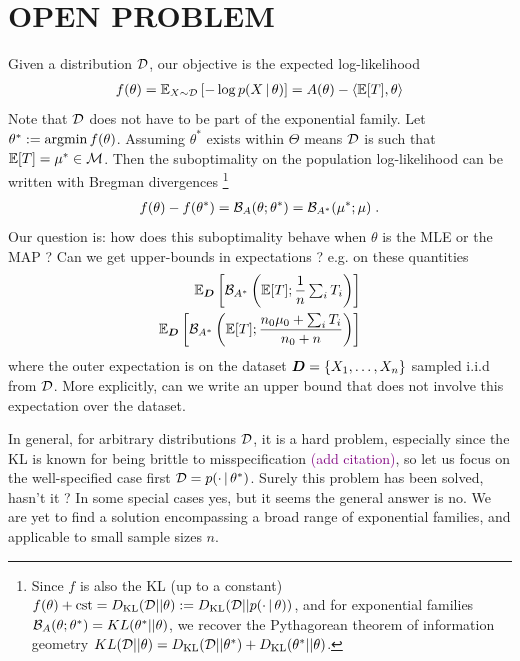 \documentclass[twoside]{article}
\let\oldsection\section
\renewcommand{\section}[1]{\oldsection{\texorpdfstring{\uppercase{#1}}{#1}}}
\newcommand{\tocite}{\textcolor{purple}{(add citation)}}
\newcommand*{\expect}[2][]{\ensuremath{\mathbb{E}_{#1} \left[ #2 \right] }} %
\newcommand{\cond}{\,\vert\,}
\newcommand{\logpart}{A}
\newcommand{\bregman}{\cB_\logpart}
\newcommand{\bregmanconj}{\cB_{\logpart^*}}
\newcommand{\nat}{\theta}
\newcommand{\m}{\mu}
\newcommand{\meanp}{\m}
\begin{document}
\section{Open Problem}
Given a distribution ${\mathcal D}$, our objective is the expected log-likelihood 
\begin{align}
	f(\nat) = \expect[X \sim \cD]{-\log p(X \cond \nat)} 
	 = \logpart(\nat) - \langle \E[T] , \nat \rangle
\end{align}
Note that ${\mathcal D}$ does not have to be part of the exponential family.
Let $\nat^* := \argmin f(\nat)$.
Assuming $\nat^*$ exists within $\Theta$ means ${\mathcal D}$ is such that $\E[T] = \meanp^* \in \cM$.
Then the suboptimality on the population log-likelihood can be written with Bregman divergences
\footnote{
Since $f$ is also the KL (up to a constant)  $f(\nat) + \cst = \KL(\cD || \nat) := \KL(\cD || p(\cdot \cond \nat))$, 
and for exponential families $\bregman(\nat ; \nat^*) = KL(\nat^* || \nat)$, we recover the Pythagorean theorem of information geometry $KL(\cD || \nat) = \KL(\cD || \nat^*) + \KL(\nat^* || \nat)$.
}
\begin{align}
	 f(\nat) - f(\nat^*)
	 = \bregman(\nat ; \nat^*) 
	 = \bregmanconj(\m^* ; \m) \; .
\end{align}
Our question is: how does this suboptimality behave when $\nat$ is the MLE or the MAP ? Can we get upper-bounds in expectations ? e.g. on these quantities
\begin{align}
	\label{eq:bregmanMLE}
	\expect[\mD]{\bregmanconj \left (\E [T] ;  \inv{n}  \smallsum_i T_i \right )} \\
	\label{eq:bregmanMAP}
	\expect[\mD]{\bregmanconj \left (\E [T] ; \frac{n_0 \m_0 + \smallsum_i T_i}{n_0+n} \right )}
\end{align}
where the outer expectation is on the dataset ${\bm{D}} = \{X_1, \dots, X_n \}$ sampled i.i.d from ${\mathcal D}$.
More explicitly, can we write an upper bound that does not involve this expectation over the dataset.

In general, for arbitrary distributions ${\mathcal D}$, it is a hard problem, especially since the KL is known for being brittle to misspecification \tocite, so let us focus on the well-specified case first $\cD = p(\cdot \cond \nat^*)$. Surely this problem has been solved, hasn't it ?
In some special cases yes, but it seems the general answer is no. 
We are yet to find a solution encompassing a broad range of exponential families, and applicable to small sample sizes $n$.
\end{document}
